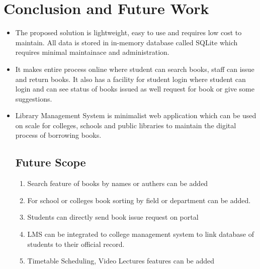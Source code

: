 \chapter{Conclusion and Future Work}
\begin{itemize}
	\item The proposed solution is lightweight, easy to use and requires low cost to maintain.
	All data is stored in in-memory database called SQLite which requires minimal maintainace and administration. 
	\item It makes entire process online where student can search books, staff can issue and return books. It also has a facility for student login where student can login and can see
	status of books issued as well request for book or give some suggestions.
	\item Library Management System is minimalist  web application which can be used on scale for colleges, schools and public libraries to maintain the digital process of borrowing books.
	
\section{Future Scope}
\begin{enumerate}
	\item Search feature of books by names or authers can be added
	\item For school or colleges book sorting by field or department can be added.
	\item Students can directly send book issue request on portal 
	\item LMS can be integrated to college management system to link database of students to their official record.
	\item Timetable Scheduling, Video Lectures features can be added
\end{enumerate}
\end{itemize}

